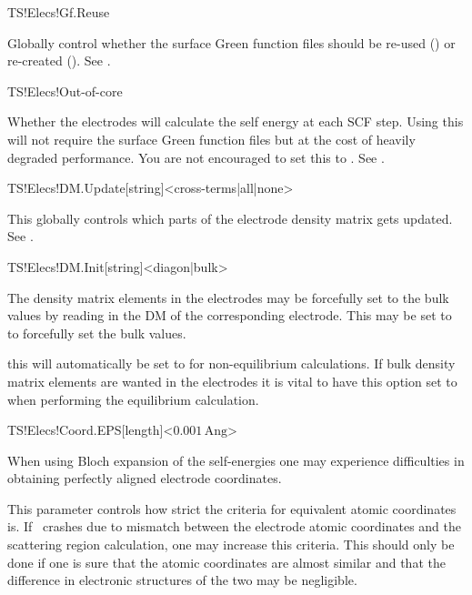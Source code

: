 \begin{fdflogicalT}{TS!Elecs!Gf.Reuse}
  
  Globally control whether the surface Green function files should
  be re-used (\fdftrue) or re-created (\fdffalse).
  See .
  
\end{fdflogicalT}

\begin{fdflogicalT}{TS!Elecs!Out-of-core}

  Whether the electrodes will calculate the self energy at each SCF
  step. Using this will not require the surface Green function files
  but at the cost of heavily degraded performance.
  You are not encouraged to set this to \fdffalse.
  See .
  
\end{fdflogicalT}

\begin{fdfentry}{TS!Elecs!DM.Update}[string]<cross-terms|all|none>

  This globally controls which parts of the electrode density matrix
  gets updated. 
  See .
  
\end{fdfentry}

\begin{fdfentry}{TS!Elecs!DM.Init}[string]<diagon|bulk>

  The density matrix elements in the electrodes may be forcefully set
  to the bulk values by reading in the DM of the corresponding
  electrode. This may be set to  to forcefully set the bulk
  values.

  \note this will automatically be set to  for
  non-equilibrium calculations. If bulk density matrix elements are
  wanted in the electrodes it is vital to have this option set to
   when performing the equilibrium calculation.
  
\end{fdfentry}

\begin{fdfentry}{TS!Elecs!Coord.EPS}[length]<$0.001\,\mathrm{Ang}$>

  When using Bloch expansion of the self-energies one may experience
  difficulties in obtaining perfectly aligned electrode coordinates.

  This parameter controls how strict the criteria for equivalent
  atomic coordinates is. If \tsiesta\ crashes due to mismatch between
  the electrode atomic coordinates and the scattering region
  calculation, one may increase this criteria. This should only be
  done if one is sure that the atomic coordinates are almost similar
  and that the difference in electronic structures of the two may be
  negligible.
  
\end{fdfentry}


